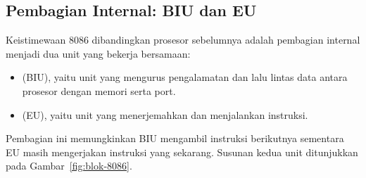\subsection{Pembagian Internal: BIU dan EU}

Keistimewaan 8086 dibandingkan prosesor sebelumnya adalah pembagian
internal menjadi dua unit yang bekerja bersamaan:

\begin{itemize}
    \item {} (BIU), yaitu unit yang mengurus
          pengalamatan dan lalu lintas data antara prosesor dengan
          memori serta port.
    \item {} (EU), yaitu unit yang menerjemahkan
          dan menjalankan instruksi.
\end{itemize}

Pembagian ini memungkinkan BIU mengambil instruksi berikutnya
sementara EU masih mengerjakan instruksi yang sekarang. Susunan
kedua unit ditunjukkan pada Gambar~\ref{fig:blok-8086}.

